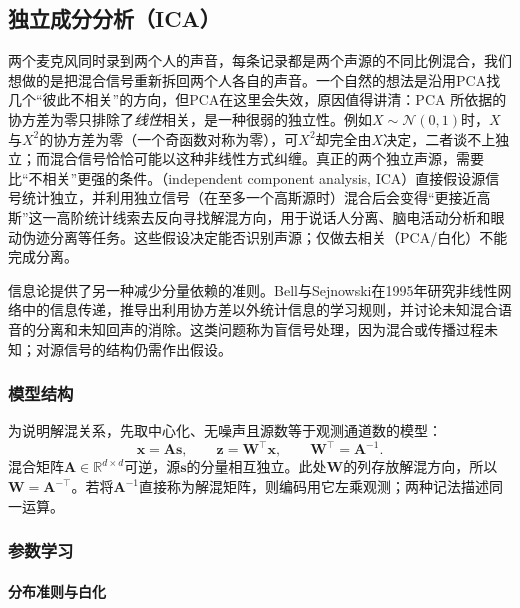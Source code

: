 \subsection{独立成分分析（ICA）}
\label{sec:dim-ica}

两个麦克风同时录到两个人的声音，每条记录都是两个声源的不同比例混合，我们想做的是把混合信号重新拆回两个人各自的声音。一个自然的想法是沿用PCA找几个“彼此不相关”的方向，但PCA在这里会失效，原因值得讲清：PCA 所依据的协方差为零只排除了\emph{线性}相关，是一种很弱的独立性。例如$X\sim\mathcal{N}(0,1)$时，$X$与$X^2$的协方差为零（一个奇函数对称为零），可$X^2$却完全由$X$决定，二者谈不上独立；而混合信号恰恰可能以这种非线性方式纠缠。真正的两个独立声源，需要比“不相关”更强的条件。（independent component analysis, ICA）直接假设源信号统计独立，并利用独立信号（在至多一个高斯源时）混合后会变得“更接近高斯”这一高阶统计线索去反向寻找解混方向，用于说话人分离、脑电活动分析和眼动伪迹分离等任务。这些假设决定能否识别声源；仅做去相关（PCA/白化）不能完成分离。

信息论提供了另一种减少分量依赖的准则。Bell与Sejnowski在1995年研究非线性网络中的信息传递，推导出利用协方差以外统计信息的学习规则，并讨论未知混合语音的分离和未知回声的消除。这类问题称为盲信号处理，因为混合或传播过程未知；对源信号的结构仍需作出假设。

\subsubsection{模型结构}
\label{sec:dim-ica-structure}

为说明解混关系，先取中心化、无噪声且源数等于观测通道数的模型：
\begin{equation}
  \bm{x}=\bm{A}\bm{s},\qquad
  \bm{z}=\bm{W}^{\top}\bm{x},\qquad
  \bm{W}^{\top}=\bm{A}^{-1}.
  \label{eq:dim-ica-model}
\end{equation}
混合矩阵$\bm{A}\in\mathbb{R}^{d\times d}$可逆，源$\bm{s}$的分量相互独立。此处$\bm{W}$的列存放解混方向，所以$\bm{W}=\bm{A}^{-\top}$。若将$\bm{A}^{-1}$直接称为解混矩阵，则编码用它左乘观测；两种记法描述同一运算。

\subsubsection{参数学习}
\label{sec:dim-ica-learning}

\paragraph{分布准则与白化}

